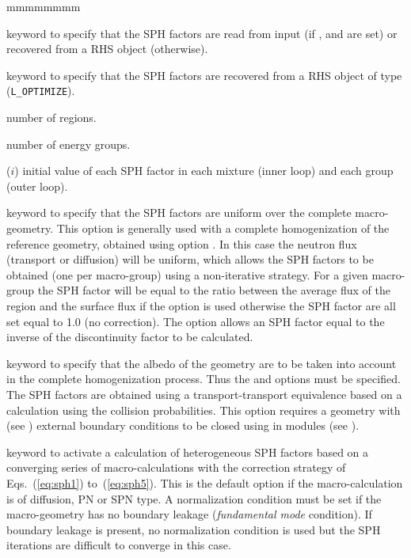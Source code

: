 \begin{ListeDeDescription}{mmmmmmmm}
\item[\moc{SPRD}] keyword to specify that the SPH factors are read from input  (if ,  and 
are set) or recovered from a RHS object (otherwise).

\item[\moc{SPOP}] keyword to specify that the SPH factors are recovered from a RHS object of type  ({\tt L\_OPTIMIZE}).

\item[\dusa{nmerge}] number of regions.

\item[\dusa{ngcond}] number of energy groups.

\item[\dusa{sph}($i$)] initial value of each SPH factor in each mixture (inner loop) and each group (outer loop).

\item[\moc{HOMO}] keyword to specify that the SPH factors are uniform over the complete
macro-geometry. This option is generally used with a complete homogenization of the
reference geometry, obtained using option  . In this case the
neutron flux  (transport or diffusion) will be
uniform, which allows the SPH factors to be obtained (one per macro-group) using
a non-iterative strategy. For a given macro-group the SPH factor will be equal
to the ratio between the average flux of the region and the surface flux if the
 option is used otherwise the SPH factor are all set equal to 1.0 (no
correction). The  option allows an SPH factor equal to the inverse of
the discontinuity factor to be calculated.

\item[\moc{ALBS}] keyword to specify that the albedo of the geometry are to be
taken into account in the complete homogenization process. Thus the 
and  options must be specified. The SPH factors are obtained using a
transport-transport equivalence based on a calculation using the collision
probabilities. This option requires a geometry with  (see
) external boundary conditions to be closed using  in
modules  (see ).\cite{ALSB2} 

\item[\moc{PN}] keyword to activate a calculation of heterogeneous SPH factors based on a converging series of
macro-calculations with the correction strategy of Eqs.~(\ref{eq:sph1}) to~(\ref{eq:sph5}). This is the default option
if the macro-calculation is of diffusion, PN or SPN type. A normalization condition must be set if the macro-geometry
has no boundary leakage ({\sl fundamental mode} condition). If boundary leakage is present, no normalization condition
is used but the SPH iterations are difficult to converge in this case.


\end{ListeDeDescription}

